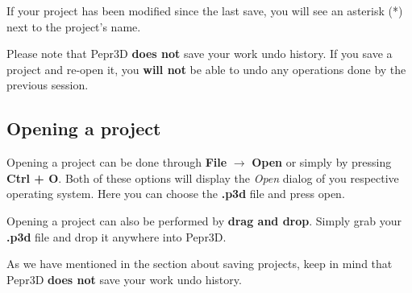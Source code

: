 If your project has been modified since the last save, you will see an asterisk (*) next to the project's name.

Please note that Pepr3D \textbf{does not} save your work undo history. If you save a project and re-open it, you \textbf{will not} be able to undo any operations done by the previous session.

\subsection{Opening a project}

Opening a project can be done through \textbf{File} $\rightarrow$ \textbf{Open} or simply by pressing \textbf{Ctrl + O}. Both of these options will display the \textit{Open} dialog of you respective operating system. Here you can choose the \textbf{.p3d} file and press open.

Opening a project can also be performed by \textbf{drag and drop}. Simply grab your \textbf{.p3d} file and drop it anywhere into Pepr3D.

As we have mentioned in the section about saving projects, keep in mind that Pepr3D \textbf{does not} save your work undo history.